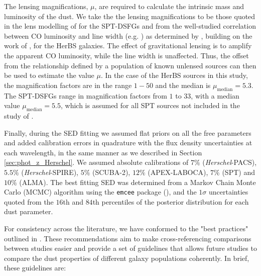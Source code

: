 The lensing magnifications, $\mu$, are required to calculate the intrinsic mass and luminosity of the dust. We take the the lensing magnifications to be those quoted in the lens modelling of \citealt{Spilker_2016} for the SPT-DSFGs and from the well-studied correlation between CO luminosity and line width (e.g. \citealt{Bothwell_2013, Dannerbauer_2017, Neri_2020}) as determined by \citealt{Urquhart_2022}, building on the work of \citealt{Harris_2012}, for the HerBS galaxies. The effect of gravitational lensing is to amplify the apparent CO luminosity, while the line width is unaffected. Thus, the offset from the relationship defined by a population of known unlensed sources can then be used to estimate the value $\mu$. In the case of the HerBS sources in this study, the magnification factors are in the range $1 - 50$ and the median is $\mu_{\textrm{median}} = 5.3$. The SPT-DSFGs range in magnification factors from $1$ to $33$, with a median value $\mu_{\textrm{median}} = 5.5$, which is assumed for all SPT sources not included in the study of \citealt{Spilker_2016}. 

Finally, during the SED fitting we assumed flat priors on all the free parameters and added calibration errors in quadrature with the flux density uncertainties at each wavelength, in the same manner as we described in Section \ref{sec:phot_z_Herschel}. We assumed absolute calibrations of $7\%$ (\textit{Herschel}-PACS), $5.5\%$ (\textit{Herschel}-SPIRE), $5\%$ (SCUBA-2), $12\%$ (APEX-LABOCA), $7\%$ (SPT) and $10\%$ (ALMA). The best fitting SED was determined from a Markov Chain Monte Carlo (MCMC) algorithm using the \texttt{emcee} package (\citealt{Foreman-Mackey_2013}), and the $1\sigma$ uncertainties quoted from the $16$th and $84$th percentiles of the posterior distribution for each dust parameter.

For consistency across the literature, we have conformed to the "best practices" outlined in \citealt{Drew_2022}. These recommendations aim to make cross-referencing comparisons between studies easier and provide a set of guidelines that allows future studies to compare the dust properties of different galaxy populations coherently. In brief, these guidelines are: 

